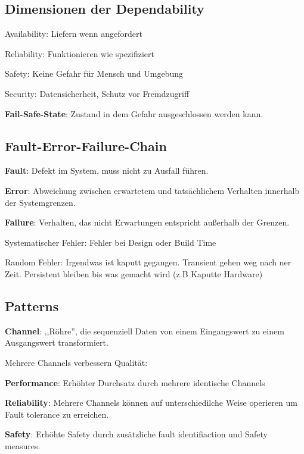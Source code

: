 \subsection{Dimensionen der Dependability}
\begin{compactitem}
    \item Availability: Liefern wenn angefordert
    \item Reliability: Funktionieren wie spezifiziert
    \item Safety: Keine Gefahr für Mensch und Umgebung
    \item Security: Datensicherheit, Schutz vor Fremdzugriff
\end{compactitem}

\textbf{Fail-Safe-State}: Zustand in dem Gefahr ausgeschlossen werden kann.

\subsection{Fault-Error-Failure-Chain}
\begin{compactitem}
    \item \textbf{Fault}: Defekt im System, muss nicht zu Ausfall führen.
    \item \textbf{Error}: Abweichung zwischen erwartetem und tatsächlichem Verhalten innerhalb der
    Systemgrenzen.
    \item \textbf{Failure}: Verhalten, das nicht Erwartungen entspricht außerhalb der Grenzen.
    \begin{compactitem}
        \item Systematischer Fehler: Fehler bei Design oder Build Time
        \item Random Fehler: Irgendwas ist kaputt gegangen. Transient gehen weg nach ner Zeit. Persistent
        bleiben bis was gemacht wird (z.B Kaputte Hardware)
    \end{compactitem}
\end{compactitem}

\subsection{Patterns}
\textbf{Channel}: ,,Röhre'', die sequenziell Daten von einem Eingangswert zu einem Ausgangswert transformiert.

Mehrere Channels verbessern Qualität:
\begin{compactitem}
    \item \textbf{Performance}: Erhöhter Durchsatz durch mehrere identische Channels
    \item \textbf{Reliability}: Mehrere Channels können auf unterschiedilche Weise operieren um
    Fault tolerance zu erreichen.
    \item \textbf{Safety}: Erhöhte Safety durch zusätzliche fault identifiaction und Safety measures.
\end{compactitem}

